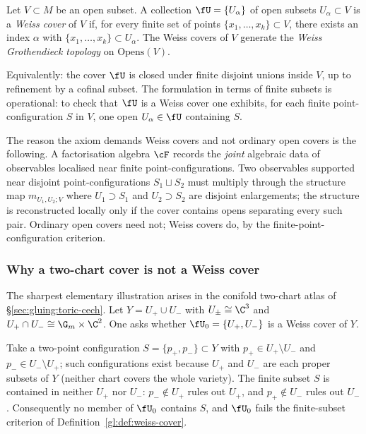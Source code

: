 \begin{definition}
\label{gl:def:weiss-cover}
Let $V \subset M$ be an open subset. A collection $\fU = \{U_\alpha\}$
of open subsets $U_\alpha \subset V$ is a \emph{Weiss cover} of $V$ if,
for every finite set of points $\{x_1, \ldots, x_k\} \subset V$, there
exists an index $\alpha$ with $\{x_1, \ldots, x_k\} \subset U_\alpha$.
The Weiss covers of $V$ generate the \emph{Weiss Grothendieck
topology} on $\mathrm{Opens}(V)$.
\end{definition}

Equivalently: the cover $\fU$ is closed under finite disjoint unions
inside $V$, up to refinement by a cofinal subset. The formulation in
terms of finite subsets is operational: to check that $\fU$ is a Weiss
cover one exhibits, for each finite point-configuration $S$ in $V$,
one open $U_\alpha \in \fU$ containing $S$.

The reason the axiom demands Weiss covers and not ordinary open covers
is the following. A factorisation algebra $\cF$ records the \emph{joint}
algebraic data of observables localised near finite point-configurations.
Two observables supported near disjoint point-configurations $S_1 \sqcup
S_2$ must multiply through the structure map $m_{U_1, U_2; V}$ where
$U_1 \supset S_1$ and $U_2 \supset S_2$ are disjoint enlargements; the
structure is reconstructed locally only if the cover contains opens
separating every such pair. Ordinary open covers need not; Weiss covers
do, by the finite-point-configuration criterion.

\subsubsection{Why a two-chart cover is not a Weiss cover}
\label{subsec:two-chart-not-weiss}

The sharpest elementary illustration arises in the conifold two-chart
atlas of \S\ref{sec:gluing:toric-cech}. Let $Y = U_+ \cup U_-$ with $U_\pm \cong \C^3$ and
$U_+ \cap U_- \cong \G_m \times \C^2$. One asks whether $\fU_0 = \{U_+,
U_-\}$ is a Weiss cover of $Y$.

Take a two-point configuration $S = \{p_+, p_-\} \subset Y$ with
$p_+ \in U_+ \setminus U_-$ and $p_- \in U_- \setminus U_+$; such
configurations exist because $U_+$ and $U_-$ are each proper subsets
of $Y$ (neither chart covers the whole variety). The finite subset
$S$ is contained in neither $U_+$ nor $U_-$: $p_- \notin U_+$ rules out
$U_+$, and $p_+ \notin U_-$ rules out $U_-$. Consequently no member of
$\fU_0$ contains $S$, and $\fU_0$ fails the finite-subset criterion of
Definition~\ref{gl:def:weiss-cover}.

